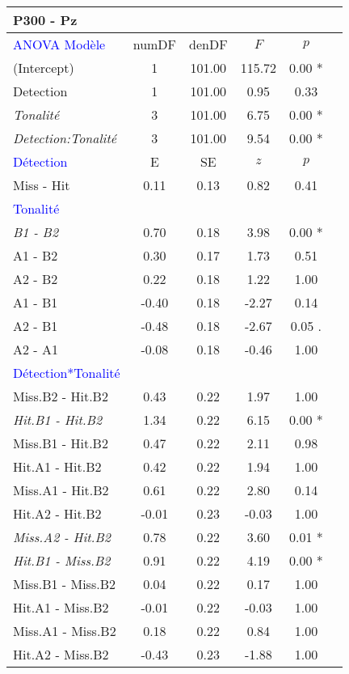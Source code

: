 \begin{landscape}
\begin{table}
\begin{multicols}{4}
\begin{tabular}{|l|*{5}{c|}}
\hline
\textbf{P300 - Pz} & & & & \\
\hline
\textcolor{blue}{ANOVA Modèle} & numDF & denDF & $F$ & $p$ \\ 
\hline
(Intercept) & 1 & 101.00 & 115.72 & 0.00 * \\ 
Detection & 1 & 101.00 & 0.95 & 0.33 \\ 
\textit{Tonalité} & 3 & 101.00 & 6.75 & 0.00 * \\ 
\textit{Detection:Tonalité} & 3 & 101.00 & 9.54 & 0.00 * \\ 
\hline
\textcolor{blue}{Détection} & E & SE & $z$ & $p$ \\
\hline
Miss - Hit & 0.11 & 0.13 & 0.82 & 0.41 \\ 
\hline
\textcolor{blue}{Tonalité} & & & & \\
\hline
\textit{B1 - B2} & 0.70 & 0.18 & 3.98 & 0.00 * \\ 
A1 - B2 & 0.30 & 0.17 & 1.73 & 0.51 \\ 
A2 - B2 & 0.22 & 0.18 & 1.22 & 1.00 \\ 
A1 - B1 & -0.40 & 0.18 & -2.27 & 0.14 \\ 
A2 - B1 & -0.48 & 0.18 & -2.67 & 0.05 . \\ 
A2 - A1 & -0.08 & 0.18 & -0.46 & 1.00 \\ 
\hline
\textcolor{blue}{Détection*Tonalité} & & & & \\
\hline
Miss.B2 - Hit.B2 & 0.43 & 0.22 & 1.97 & 1.00 \\ 
\textit{Hit.B1 - Hit.B2} & 1.34 & 0.22 & 6.15 & 0.00 * \\ 
Miss.B1 - Hit.B2 & 0.47 & 0.22 & 2.11 & 0.98 \\ 
Hit.A1 - Hit.B2 & 0.42 & 0.22 & 1.94 & 1.00 \\ 
Miss.A1 - Hit.B2 & 0.61 & 0.22 & 2.80 & 0.14 \\ 
Hit.A2 - Hit.B2 & -0.01 & 0.23 & -0.03 & 1.00 \\ 
\textit{Miss.A2 - Hit.B2} & 0.78 & 0.22 & 3.60 & 0.01 * \\ 
\textit{Hit.B1 - Miss.B2} & 0.91 & 0.22 & 4.19 & 0.00 * \\ 
Miss.B1 - Miss.B2 & 0.04 & 0.22 & 0.17 & 1.00 \\ 
Hit.A1 - Miss.B2 & -0.01 & 0.22 & -0.03 & 1.00 \\ 
Miss.A1 - Miss.B2 & 0.18 & 0.22 & 0.84 & 1.00 \\ 
Hit.A2 - Miss.B2 & -0.43 & 0.23 & -1.88 & 1.00 \\ 

\end{tabular}
\end{multicols}
\end{table}
\end{landscape}
